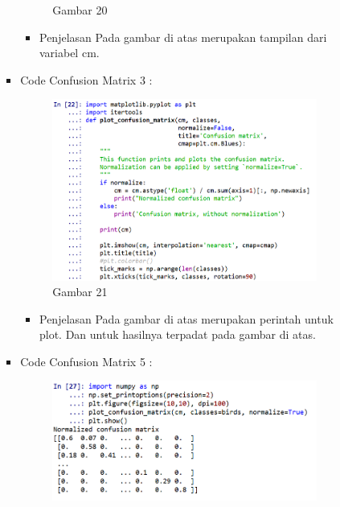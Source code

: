 \begin{enumerate}
\begin{itemize}
\begin{itemize}
\begin{itemize}
\begin{figure}[ht]
\caption{Gambar 20}
\label{contoh}
\end{figure}
\par
\begin{itemize}
\item Penjelasan  Pada gambar di atas merupakan tampilan dari variabel cm.
\par
\par
\end{itemize}
\item Code Confusion Matrix 3 :
\par
\begin{figure}[ht]
\centering
\includegraphics[scale=0.7]{figures/andi/RF22.PNG}
\caption{Gambar 21}
\label{contoh}
\end{figure}
\par
\begin{itemize}
\item Penjelasan Pada gambar di atas merupakan perintah untuk plot. Dan untuk hasilnya terpadat pada gambar di atas. 
\par
\par
\end{itemize}
\item Code Confusion Matrix 5 :
\par
\begin{figure}[ht]
\centering
\includegraphics[scale=0.7]{figures/andi/RF24.PNG}

\end{figure}
\end{itemize}
\end{itemize}
\end{itemize}
\end{enumerate}
